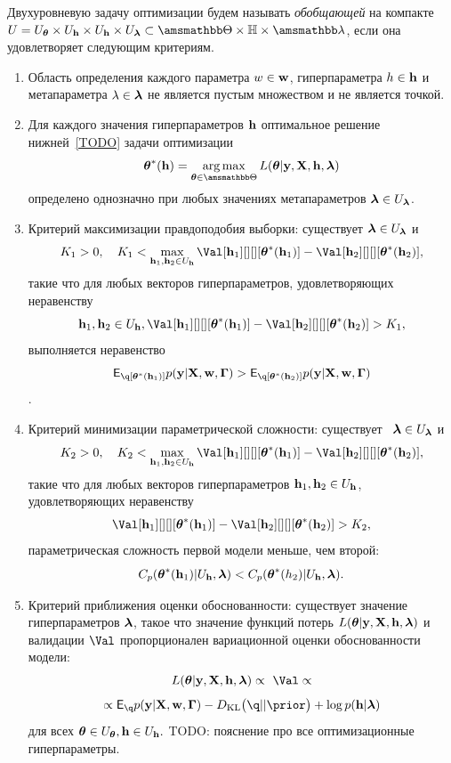 \begin{defin}
Двухуровневую задачу оптимизации будем называть \textit{обобщающей} на компакте $U = \Uteta \times \Uh \times \Uh \times \Ulam \subset \Tetab \times \Hb \times \Lamb$, если она удовлетворяет следующим критериям.
\begin{enumerate}
\item Область определения каждого параметра $w \in \mathbf{w}$, гиперпараметра $h \in \mathbf{h}$ и метапараметра $\lambda \in \boldsymbol{\lambda}$ не  является пустым множеством и не является точкой.
\item Для каждого значения гиперпараметров $\mathbf{h}$ оптимальное решение нижней~\eqref{TODO} задачи оптимизации 
\[
\teta^{*}(\h) = \argmax_{\teta \in \Tetab} \Loss
\]
определено однозначно при любых значениях метапараметров $\boldsymbol{\lambda} \in U_{\boldsymbol{\lambda}}$.

\item Критерий максимизации правдоподобия выборки: существует $\boldsymbol{\lambda} \in U_{\boldsymbol{\lambda}}$ и  $$K_1>0, \quad K_1 < \max_{\h_1,\h_2 \in \Uh} \Val[\h_1][][][\teta^{*}(\h_1)] - \Val[\h_2][][][\teta^{*}(\h_2)],$$ такие что для любых векторов гиперпараметров, удовлетворяющих неравенству $$\h_1, \h_2 \in \Uh, \Val[\h_1][][][\teta^{*}(\h_1)] - \Val[\h_2][][][\teta^{*}(\h_2)] > K_1,$$ выполняется неравенство $$\E_{\q[\teta^{*}(\h_1)]}\LL > \E_{\q[\teta^{*}(\h_2)]}\LL$$.

\item Критерий минимизации параметрической сложности:  существует  $\boldsymbol{\lambda} \in U_{\boldsymbol{\lambda}}$ и $$K_2>0, \quad K_2 < \max_{\h_1, \h_2 \in \Uh} \Val[\h_1][][][\teta^{*}(\h_1)] - \Val[\h_2][][][\teta^{*}(\h_2)],$$ такие что для любых векторов гиперпараметров $\mathbf{h}_1,\mathbf{h}_2 \in U_{\mathbf{h}}$, удовлетворяющих неравенству $$\Val[\h_1][][][\teta^{*}(\h_1)] - \Val[\h_2][][][\teta^{*}(\h_2)]>K_2,$$ параметрическая сложность первой модели меньше, чем второй: $$C_p(\boldsymbol{\theta}^{*}(\mathbf{h}_1)|U_{\mathbf{h}},\boldsymbol{\lambda})<C_p(\boldsymbol{\theta}^{*}(h_2)|U_{\mathbf{h}},\boldsymbol{\lambda}).$$

\item Критерий приближения оценки обоснованности: существует значение гиперпараметров $\boldsymbol{\lambda}$, такое что значение функций потерь $L(\boldsymbol{\theta} |\mathbf{y},\mathbf{X},\mathbf{h},\boldsymbol{\lambda})$ и валидации $\Val$ пропорционален вариационной оценки обоснованности модели: $$\Loss \propto  \Val \propto $$
$$\propto
\E_{\q}\LL - \KL{\q}{\prior} + \log\priorh$$ для всех $\boldsymbol{\theta} \in U_{\boldsymbol{\theta}}, \mathbf{h} \in U_{\mathbf{h}}.$ 
TODO: пояснение про все оптимизационные гиперпараметры.


\end{enumerate}
\end{defin}
